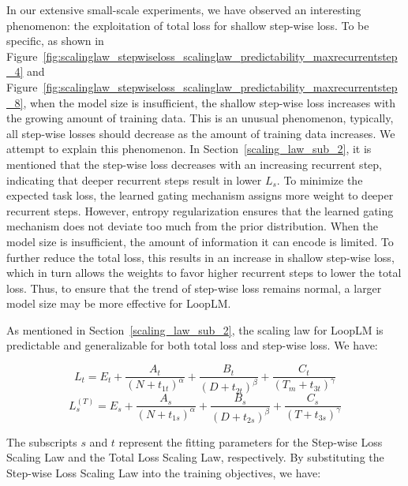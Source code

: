 \documentclass[]{bytedance_seed}
\newcommand{\1}{\mathbf{1}}
\newcommand{\ut}{LoopLM}
\begin{document}
{In our extensive small-scale experiments, we have observed an interesting phenomenon: the exploitation of total loss for shallow step-wise loss. To be specific, as shown in Figure~\ref{fig:scalinglaw_stepwiseloss_scalinglaw_predictability_maxrecurrentstep_4} and Figure~\ref{fig:scalinglaw_stepwiseloss_scalinglaw_predictability_maxrecurrentstep_8}, when the model size is insufficient, the shallow step-wise loss increases with the growing amount of training data. This is an unusual phenomenon, typically, all step-wise losses should decrease as the amount of training data increases. We attempt to explain this phenomenon. In Section~\ref{scaling_law_sub_2}, it is mentioned that the step-wise loss decreases with an increasing recurrent step, indicating that deeper recurrent steps result in lower $L_s$. To minimize the expected task loss, the learned gating mechanism assigns more weight to deeper recurrent steps. However, entropy regularization ensures that the learned gating mechanism does not deviate too much from the prior distribution. When the model size is insufficient, the amount of information it can encode is limited. To further reduce the total loss, this results in an increase in shallow step-wise loss, which in turn allows the weights to favor higher recurrent steps to lower the total loss. 
Thus, to ensure that the trend of step-wise loss remains normal, a larger model size may be more effective for \ut{}.

As mentioned in Section~\ref{scaling_law_sub_2}, the scaling law for \ut{} is predictable and generalizable for both total loss and step-wise loss. We have:



$$
L_t = E_t + \frac{A_t}{(N+t_{1t})^\alpha} + \frac{B_t}{(D+t_{2t})^\beta} + \frac{C_t}{(T_m+t_{3t})^\gamma}
$$
$$
L_s^{(T)} = E_s + \frac{A_s}{(N+t_{1s})^\alpha} + \frac{B_s}{(D+t_{2s})^\beta} + \frac{C_s}{(T+t_{3s})^\gamma}
$$

The subscripts $s$ and $t$ represent the fitting parameters for the Step-wise Loss Scaling Law and the Total Loss Scaling Law, respectively. By substituting the Step-wise Loss Scaling Law into the training objectives, we have:

}
\end{document}
